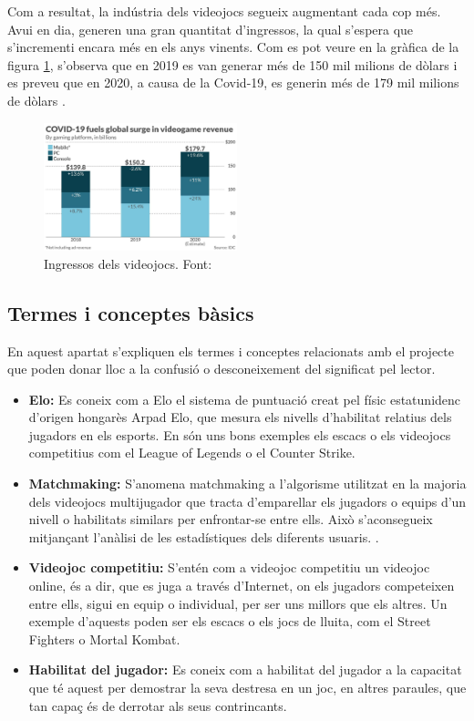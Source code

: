 \documentclass[a4paper]{article}
\begin{document}
Com a resultat, la indústria dels videojocs segueix augmentant cada cop més. Avui en dia, generen una gran quantitat d'ingressos, la qual s'espera que s'incrementi encara més en els anys vinents. Com es pot veure en la gràfica de la figura \ref{fig:VideogamesRevenuesImage}, s'observa que en 2019 es van generar més de 150 mil milions de dòlars i es preveu que en 2020, a causa de la Covid-19, es generin més de 179 mil milions de dòlars \cite{VidogamesMoreMoney}. 

\begin{figure}[H]
    \centering
    \includegraphics[width=0.5\textwidth]{images/videogamesMoney.jpeg}
    \caption{Ingressos dels videojocs. Font: \cite{VidogamesMoreMoney}}
    \label{fig:VideogamesRevenuesImage}
\end{figure}

\subsection{Termes i conceptes bàsics}
En aquest apartat s'expliquen els termes i conceptes relacionats amb el projecte que poden donar lloc a la confusió o desconeixement del significat pel lector.

\begin{itemize}
\item \textbf{Elo:} Es coneix com a Elo el sistema de puntuació creat pel físic estatunidenc d'origen hongarès Arpad Elo, que mesura els nivells d'habilitat relatius dels jugadors en els esports. En són uns bons exemples els escacs o els videojocs competitius com el League of Legends o el Counter Strike. \cite{wikipediaElo}

\item \textbf{Matchmaking:} S'anomena matchmaking a l'algorisme utilitzat en la majoria dels videojocs multijugador que tracta d'emparellar els jugadors o equips d'un nivell o habilitats similars per enfrontar-se entre ells. Això s'aconsegueix mitjançant l'anàlisi de les estadístiques dels diferents usuaris. \cite{matchmakingDef}.

\item \textbf{Videojoc competitiu:} S'entén com a videojoc competitiu un videojoc online, és a dir, que es juga a través d'Internet, on els jugadors competeixen entre ells, sigui en equip o individual, per ser uns millors que els altres. Un exemple d'aquests poden ser els escacs o els jocs de lluita, com el Street Fighters o Mortal Kombat.

\item \textbf{Habilitat del jugador:} Es coneix com a habilitat del jugador a la capacitat que té aquest per demostrar la seva destresa en un joc, en altres paraules, que tan capaç és de derrotar als seus contrincants.
\end{itemize}
\end{document}
